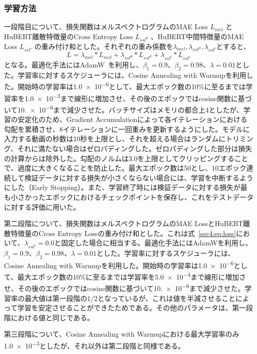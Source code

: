 \documentclass[12pt]{jarticle}
\numberwithin{equation}{section}    %
\numberwithin{figure}{section}      %
\numberwithin{table}{section}      %
\begin{document}
\subsubsection{学習方法}
一段階目について、損失関数はメルスペクトログラムのMAE Loss $L_{mel}$ とHuBERT離散特徴量のCross Entropy Loss $L_{ssl^{d}}$ 、HuBERT中間特徴量のMAE Loss $L_{ssl^{i}}$ の重み付け和とした。それぞれの重み係数を$\lambda_{mel}, \lambda_{ssl^{d}}, \lambda_{ssl^{i}}$とすると、
\begin{equation}
    \label{sec4:eq:loss}
    L = \lambda_{mel} * L_{mel} + \lambda_{ssl^{d}} * L_{ssl^{d}} + \lambda_{ssl^{i}} * L_{ssl^{i}}
\end{equation}
となる。最適化手法にはAdamW~\cite{loshchilov2017decoupled}を利用し、$\beta_{1} = 0.9$、$\beta_{2} = 0.98$、$\lambda = 0.01$とした。学習率に対するスケジューラには、Cosine Annealing with Warmupを利用した。開始時の学習率は\num{1.0e-6}として、最大エポック数の10\%に至るまでは学習率を\num{1.0e-3}まで線形に増加させ、その後のエポックではcosine関数に基づいて\num{10.e-6}まで減少させた。バッチサイズはメモリの都合上4としたが、学習の安定化のため、Gradient Accumulationによって各イテレーションにおける勾配を累積させ、8イテレーションに一回重みを更新するようにした。モデルに入力する動画の秒数は10秒を上限とし、それを超える場合はランダムにトリミング、それに満たない場合はゼロパディングした。ゼロパディングした部分は損失の計算からは除外した。勾配のノルムは3.0を上限としてクリッピングすることで、過度に大きくなることを防止した。最大エポック数は50とし、10エポック連続して検証データに対する損失が小さくならない場合には、学習を中断するようにした（Early Stopping）。また、学習終了時には検証データに対する損失が最も小さかったエポックにおけるチェックポイントを保存し、これをテストデータに対する評価に用いた。

第二段階について、損失関数はメルスペクトログラムのMAE LossとHuBERT離散特徴量のCross Entropy Lossの重み付け和とした。これは式~\eqref{sec4:eq:loss}において、$\lambda_{ssl^{i}} = 0.0$と固定した場合に相当する。最適化手法にはAdamWを利用し、$\beta_{1} = 0.9$、$\beta_{2} = 0.98$、$\lambda = 0.01$とした。学習率に対するスケジューラには、Cosine Annealing with Warmupを利用した。開始時の学習率は\num{1.0e-6}として、最大エポック数の10\%に至るまでは学習率を\num{5.0e-4}まで線形に増加させ、その後のエポックではcosine関数に基づいて\num{10.e-6}まで減少させた。学習率の最大値は第一段階の$1/2$となっているが、これは値を半減させることによって学習を安定させることができたためである。その他のパラメータは、第一段階における値と同じである。

第三段階について、Cosine Annealing with Warmupにおける最大学習率のみ\num{1.0e-3}としたが、それ以外は第二段階と同様である。
\end{document}
